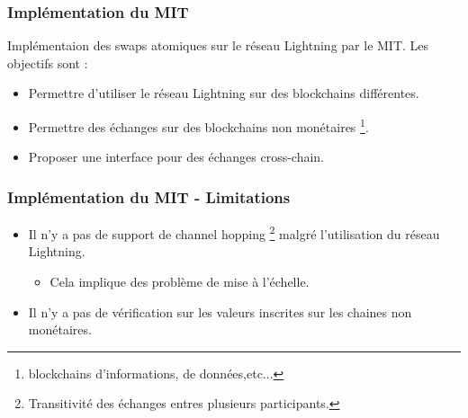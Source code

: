 \begin{frame}
	\frametitle{Implémentation du MIT}
	Implémentaion des swaps atomiques sur le réseau Lightning par le MIT. Les objectifs sont :
	\newline
	\begin{itemize}
		\item Permettre d'utiliser le réseau Lightning sur des blockchains différentes.
		\item Permettre des échanges sur des blockchains non monétaires \footnote{blockchains d'informations, de données,etc...}.
		\item Proposer une interface pour des échanges cross-chain.
	\end{itemize}

\end{frame}


\begin{frame}
	\frametitle{Implémentation du MIT - Limitations}


	\begin{itemize}
		\item Il n'y a pas de support de channel hopping \footnote{Transitivité des échanges entres plusieurs participants.} malgré l'utilisation du réseau Lightning.
		      \begin{itemize}
			      \item Cela implique des problème de mise à l'échelle.
		      \end{itemize}
		\item Il n'y a pas de vérification sur les valeurs inscrites sur les chaines non monétaires.
	\end{itemize}
\end{frame}
